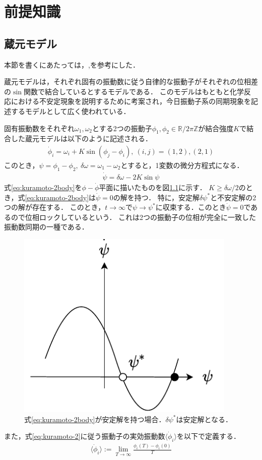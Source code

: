 \documentclass[../main]{subfiles}
\begin{document}
\chapter{前提知識}
\section{蔵元モデル}
本節を書くにあたっては，\cite{RODRIGUES20161},\cite{biorhythm}を参考にした．

蔵元モデルは，それぞれ固有の振動数に従う自律的な振動子がそれぞれの位相差の$\sin$関数で結合しているとするモデルである．
このモデルはもともと化学反応における不安定現象を説明するために考案され\cite{kuramoto1975}，今日振動子系の同期現象を記述するモデルとして広く使われている．

固有振動数をそれぞれ$\omega_1,\omega_2$とする2つの振動子$\phi_1,\phi_2\in\mathbb{R}/2\pi\mathbb{Z}$が結合強度$K$で結合した蔵元モデルは以下のように記述される．
\begin{align}
    \label{eq:kuramoto-2}
    \dot{\phi}_i=\omega_i+K\sin(\phi_j-\phi_i),\ (i,j)=(1,2),(2,1)
\end{align}
このとき，$\psi=\phi_1-\phi_2,\ \delta\omega=\omega_1-\omega_2$とすると，1変数の微分方程式になる．
\begin{align}
    \label{eq:kuramoto-2body}
    \dot{\psi}=\delta\omega-2K\sin\psi  
\end{align}
式\eqref{eq:kuramoto-2body}を$\phi-\dot{\phi}$平面に描いたものを図\ref{fig:kuramoto-2}に示す．
$K\geq\delta\omega/2$のとき，式\eqref{eq:kuramoto-2body}は$\dot{\psi}=0$の解を持つ．
特に，安定解$\delta\psi^\ast$と不安定解の2つの解が存在する．
このとき，$t\to\infty$で$\psi\to\psi^\ast$に収束する．このとき$\dot{\psi}=0$であるので位相ロックしているという．
これは2つの振動子の位相が完全に一致した振動数同期の一種である．\\
\begin{figure}[t]
\centering
\includegraphics[width=105mm]{images/kuramoto-2.pdf}
\centering
\caption{式\eqref{eq:kuramoto-2body}が安定解を持つ場合．$\delta\psi^\ast$は安定解となる．}
\label{fig:kuramoto-2}
\end{figure}
また，式\eqref{eq:kuramoto-2}に従う振動子の実効振動数$\langle\dot{\phi}_i\rangle$を以下で定義する．
\begin{align*}
    \langle\dot{\phi}_i\rangle:=\lim_{T\to\infty}\frac{\phi_i(T)-\phi_i(0)}{T}
\end{align*}
\end{document}
